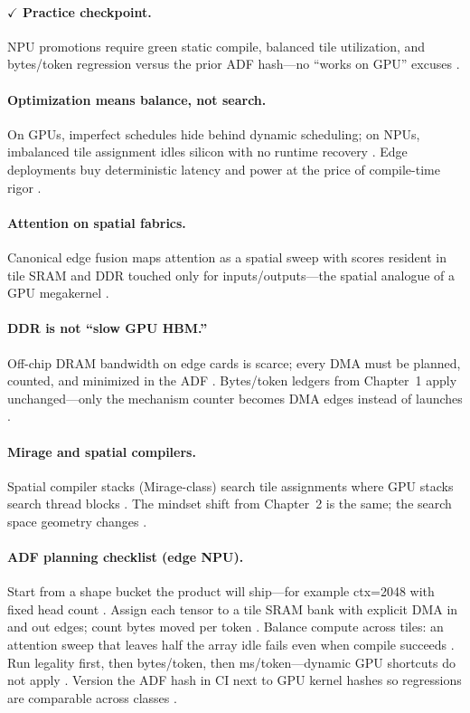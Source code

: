 \paragraph{$\checkmark$ Practice checkpoint.}
NPU promotions require green static compile, balanced tile utilization, and bytes/token regression versus the prior ADF hash---no ``works on GPU'' excuses \citep{yirage2026,amd2024xdna}.

\paragraph{Optimization means balance, not search.}
On GPUs, imperfect schedules hide behind dynamic scheduling; on NPUs, imbalanced tile assignment idles silicon with no runtime recovery \citep{wu2024mirage,amd2024xdna}.
Edge deployments buy deterministic latency and power at the price of compile-time rigor \citep{amd2024aie,rotem2018glow}.

\paragraph{Attention on spatial fabrics.}
Canonical edge fusion maps attention as a spatial sweep with scores resident in tile SRAM and DDR touched only for inputs/outputs---the spatial analogue of a GPU megakernel \citep{dao2022flashattention,memoryfloor2026,amd2024xdna}.

\paragraph{DDR is not ``slow GPU HBM.''}
Off-chip DRAM bandwidth on edge cards is scarce; every DMA must be planned, counted, and minimized in the ADF \citep{amd2024xdna,amd2024aie}.
Bytes/token ledgers from Chapter~1 apply unchanged---only the mechanism counter becomes DMA edges instead of launches \citep{taxbreak2026,memoryfloor2026}.

\paragraph{Mirage and spatial compilers.}
Spatial compiler stacks (Mirage-class) search tile assignments where GPU stacks search thread blocks \citep{wu2024mirage,amd2024xdna}.
The mindset shift from Chapter~2 is the same; the search space geometry changes \citep{chen2020compilerbasedhardw,yirage2026}.

\paragraph{ADF planning checklist (edge NPU).}
Start from a shape bucket the product will ship---for example ctx=2048 with fixed head count \citep{lai2023relax,amd2024xdna}.
Assign each tensor to a tile SRAM bank with explicit DMA in and out edges; count bytes moved per token \citep{amd2024aie}.
Balance compute across tiles: an attention sweep that leaves half the array idle fails even when compile succeeds \citep{wu2024mirage}.
Run legality first, then bytes/token, then ms/token---dynamic GPU shortcuts do not apply \citep{yirage2026,memoryfloor2026}.
Version the ADF hash in CI next to GPU kernel hashes so regressions are comparable across classes \citep{patel2025llminference}.

